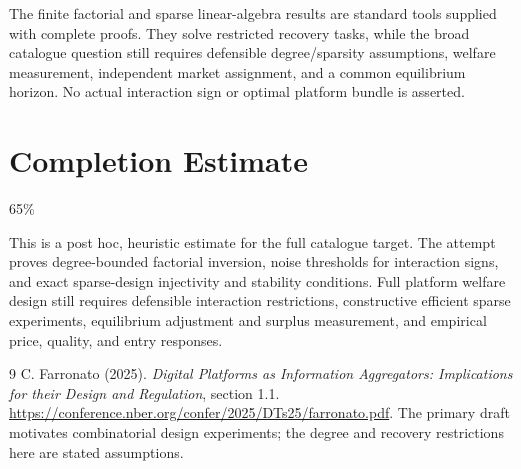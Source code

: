 \documentclass[11pt,a4paper]{article}
\begin{document}
The finite factorial and sparse linear-algebra results are standard tools supplied with complete proofs. They solve restricted recovery tasks, while the broad catalogue question still requires defensible degree/sparsity assumptions, welfare measurement, independent market assignment, and a common equilibrium horizon. No actual interaction sign or optimal platform bundle is asserted.

\section{Completion Estimate}
65\%

This is a post hoc, heuristic estimate for the full catalogue target.
The attempt proves degree-bounded factorial inversion, noise thresholds for interaction signs, and exact sparse-design injectivity and stability conditions. Full platform welfare design still requires defensible interaction restrictions, constructive efficient sparse experiments, equilibrium adjustment and surplus measurement, and empirical price, quality, and entry responses.

\begin{thebibliography}{9}
 C. Farronato (2025). \emph{Digital Platforms as Information Aggregators: Implications for their Design and Regulation}, section 1.1.
\url{https://conference.nber.org/confer/2025/DTs25/farronato.pdf}.
The primary draft motivates combinatorial design experiments; the degree and recovery restrictions here are stated assumptions.
\end{thebibliography}
\end{document}
